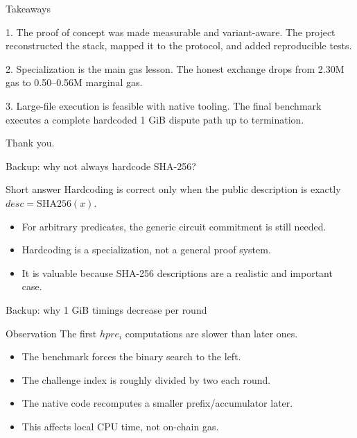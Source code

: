 \documentclass[aspectratio=169,10pt]{beamer}
\newcommand{\giB}{GiB}
\begin{document}
\begin{frame}{Takeaways}
  \begin{block}{1. The proof of concept was made measurable and variant-aware.}
    The project reconstructed the stack, mapped it to the protocol, and added reproducible tests.
  \end{block}
  \begin{block}{2. Specialization is the main gas lesson.}
    The honest exchange drops from 2.30M gas to 0.50--0.56M marginal gas.
  \end{block}
  \begin{block}{3. Large-file execution is feasible with native tooling.}
    The final benchmark executes a complete hardcoded 1 \giB{} dispute path up to termination.
  \end{block}
  \vfill
  \centering
  \Large Thank you.
\end{frame}

\begin{frame}{Backup: why not always hardcode SHA-256?}
  \begin{block}{Short answer}
    Hardcoding is correct only when the public description is exactly
    \(desc=\mathrm{SHA256}(x)\).
  \end{block}
  \begin{itemize}
    \item For arbitrary predicates, the generic circuit commitment is still needed.
    \item Hardcoding is a specialization, not a general proof system.
    \item It is valuable because SHA-256 descriptions are a realistic and important case.
  \end{itemize}
\end{frame}

\begin{frame}{Backup: why 1 \giB{} timings decrease per round}
  \begin{block}{Observation}
    The first \(hpre_i\) computations are slower than later ones.
  \end{block}
  \begin{itemize}
    \item The benchmark forces the binary search to the left.
    \item The challenge index is roughly divided by two each round.
    \item The native code recomputes a smaller prefix/accumulator later.
    \item This affects local CPU time, not on-chain gas.
  \end{itemize}
\end{frame}
\end{document}
